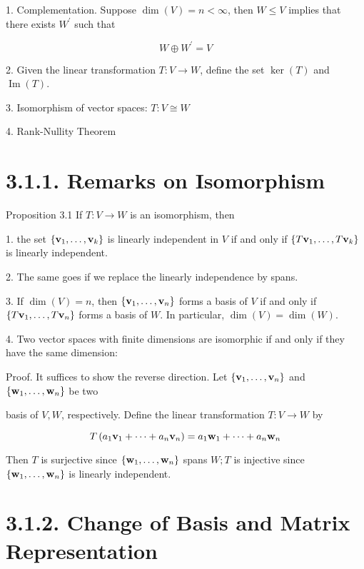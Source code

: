 \documentclass[11pt]{article}
\begin{document}
1. Complementation. Suppose \(\dim \left( V\right)  = n < \infty\), then \(W \leq  V\) implies that there exists \({W}^{\prime }\) such that

\[
W \oplus  {W}^{\prime } = V
\]

2. Given the linear transformation \(T : V \rightarrow  W\), define the set \(\ker \left( T\right)\) and \(\operatorname{Im}\left( T\right)\).

3. Isomorphism of vector spaces: \(T : V \cong  W\)

4. Rank-Nullity Theorem

\section*{3.1.1. Remarks on Isomorphism}

Proposition 3.1 If \(T : V \rightarrow  W\) is an isomorphism, then

1. the set \(\left\{  {{\bf v}_1,\ldots ,{\bf v}_{k}}\right\}\) is linearly independent in \(V\) if and only if \(\left\{  {T{\bf v}_1,\ldots ,T{\bf v}_{k}}\right\}\) is linearly independent.

2. The same goes if we replace the linearly independence by spans.

3. If \(\dim \left( V\right)  = n\), then \(\left\{  {{\bf v}_1,\ldots ,{\bf v}_n}\right\}\) forms a basis of \(V\) if and only if \(\left\{  {T{\bf v}_1,\ldots ,T{\bf v}_n}\right\}\) forms a basis of \(W\). In particular, \(\dim \left( V\right)  = \dim \left( W\right)\).

4. Two vector spaces with finite dimensions are isomorphic if and only if they have the same dimension:

Proof. It suffices to show the reverse direction. Let \(\left\{  {{\bf v}_1,\ldots ,{\bf v}_n}\right\}\) and \(\left\{  {{\bf w}_1,\ldots ,{\bf w}_n}\right\}\) be two

basis of \(V,W\), respectively. Define the linear transformation \(T : V \rightarrow  W\) by

\[
T\left( {{a}_1{\bf v}_1 + \cdots  + {a}_n{\bf v}_n}\right)  = {a}_1{\bf w}_1 + \cdots  + {a}_n{\bf w}_n
\]

Then \(T\) is surjective since \(\left\{  {{\bf w}_1,\ldots ,{\bf w}_n}\right\}\) spans \(W;T\) is injective since \(\left\{  {{\bf w}_1,\ldots ,{\bf w}_n}\right\}\) is linearly independent.

\section*{3.1.2. Change of Basis and Matrix Representation}
\end{document}
